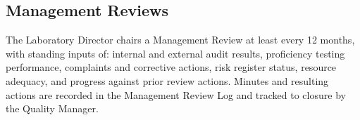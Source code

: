 \subsection{Management Reviews}

The Laboratory Director chairs a Management Review at least every 12 months, with standing
inputs of: internal and external audit results, proficiency testing performance, complaints
and corrective actions, risk register status, resource adequacy, and progress against prior
review actions. Minutes and resulting actions are recorded in the Management Review Log and
tracked to closure by the Quality Manager.
